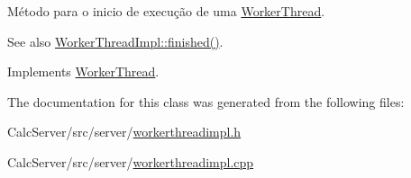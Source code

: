 Método para o inicio de execução de uma \hyperlink{classWorkerThread}{Worker\+Thread}. 

\begin{DoxySeeAlso}{See also}
\hyperlink{classWorkerThreadImpl_aca36cb83741dce52b5d92cc7a2844257}{Worker\+Thread\+Impl\+::finished()}. 
\end{DoxySeeAlso}


Implements \hyperlink{classWorkerThread_a4d6d532dfbb27c5a435018ea697acb11}{Worker\+Thread}.



The documentation for this class was generated from the following files\+:\begin{DoxyCompactItemize}
\item 
Calc\+Server/src/server/\hyperlink{workerthreadimpl_8h}{workerthreadimpl.\+h}\item 
Calc\+Server/src/server/\hyperlink{workerthreadimpl_8cpp}{workerthreadimpl.\+cpp}\end{DoxyCompactItemize}
